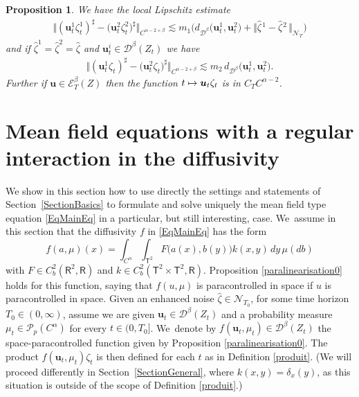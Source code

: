 \documentclass[10pt]{amsart}
\newcommand\mto{\mathchoice{\longmapsto}{\mapsto}{\mapsto}{\mapsto}}
\newtheorem{prop}[thm]{Proposition}
\theoremstyle{definition}
\newcommand\bbR{\mathbf{\mathsf{R}}}
\newcommand{\mcD}{\mathcal{D}}
\newcommand{\mcE}{\mathcal{E}}
\newcommand{\mcN}{\mathcal{N}}
\newcommand{\mcP}{\mathcal{P}}
\newcommand{\bsu}{\boldsymbol{u}}
\begin{document}
\begin{prop} \label{PropLocalLipschitzSharp}
We have the local Lipschitz estimate
\begin{align*}
\big\Vert(\bsu^1_t\zeta^1_t)^\sharp - \bigl(\bsu^2_t \zeta^2_t\bigr)^\sharp\big\Vert_{C^{\alpha-2+\beta}} \lesssim m_1\bigl(d_{\mcD^\beta}\bigl(\bsu^1_t, \bsu^2_t\bigr) + \big\Vert \widehat\zeta\hspace{1pt}^1 - \widehat\zeta\hspace{1pt}^2\,\big\Vert_{{\boldsymbol{\mcN}}_T} \bigr)
\end{align*}
and if $\widehat\zeta^1=\widehat\zeta^2=\widehat\zeta$ and $\bsu^i_t\in\mcD^\beta(Z_t)$ we have
\begin{align*}
\big\Vert(\bsu^1_t\zeta_t)^\sharp - \bigl(\bsu^2_t \zeta_t\bigr)^\sharp\big\Vert_{C^{\alpha-2+\beta}} \lesssim m_2 \, d_{\mcD^\beta}\bigl(\bsu^1_t, \bsu^2_t\bigr).
\end{align*}
Further if $\bsu\in\mcE^\beta_T(Z)$ then the function $t\mto \bsu_t\zeta_t$ is in $C_TC^{\alpha-2}$.
\end{prop}

\section{Mean field equations with a regular interaction in the diffusivity}
\label{SectionRegularInteraction}

We show in this section how to use directly the settings and statements of Section~\ref{SectionBasics} to formulate and solve uniquely the mean field type equation \eqref{EqMainEq} in a particular, but still interesting, case. We~assume in this section that the diffusivity $f$ in \eqref{EqMainEq} has the form
\begin{equation} \label{EqFormulaFNiceKernel}
f(a,\mu)(x) = \int_{C^\alpha}\int_{\mathsf{T}^2} F\bigl(a(x), b(y)\bigr)k(x,y) \, dy \, \mu(db)
\end{equation}
with $F\in C^{ 2}_b(\bbR^2,\bbR)$ and $k\in C^2_b(\mathsf{T}^2\times\mathsf{T}^2,\bbR)$. Proposition \ref{paralinearisation0} holds for this function, saying that $f(u,\mu)$ is paracontrolled in space if $u$ is paracontrolled in space. Given an enhanced noise $\widehat{\zeta}\in{{\boldsymbol{\mcN}}_{T_0}}$, for some time horizon $T_0\in(0,\infty)$, assume we are given $\bsu_t\in\mcD^\beta(Z_t)$ and a probability measure $\mu_t\in\mcP_p(C^\alpha)$ for every $t\in(0,T_0]$. We~denote by $f(\bsu_t,\mu_t)\in \mcD^\beta(Z_t)$ the space-paracontrolled function given by Proposition \ref{paralinearisation0}. The product $f(\bsu_t,\mu_t)\zeta_t$ is then defined for each $t$ as in Definition \ref{produit}. (We will proceed differently in Section~\ref{SectionGeneral}, where $k(x,y)=\delta_x(y)$, as this situation is outside of the scope of Definition \ref{produit}.)
\end{document}
